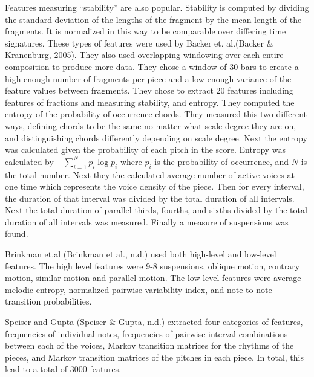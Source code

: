 \documentclass[12pt,twoside]{reedthesis}
\theoremstyle{definition}
\theoremstyle{definition}
\theoremstyle{definition}
\theoremstyle{remark}
\begin{document}
Features measuring ``stability'' are also popular. Stability is computed
by dividing the standard deviation of the lengths of the fragment by the
mean length of the fragments. It is normalized in this way to be
comparable over differing time signatures. These types of features were
used by Backer et. al.(Backer \& Kranenburg, 2005). They also used
overlapping windowing over each entire composition to produce more data.
They chose a window of 30 bars to create a high enough number of
fragments per piece and a low enough variance of the feature values
between fragments. They chose to extract 20 features including features
of fractions and measuring stability, and entropy. They computed the
entropy of the probability of occurrence chords. They measured this two
different ways, defining chords to be the same no matter what scale
degree they are on, and distinguishing chords differently depending on
scale degree. Next the entropy was calculated given the probability of
each pitch in the score. Entropy was calculated by
\(-\sum_{i = 1}^{N}p_i\log{p_i}\) where \(p_i\) is the probability of
occurrence, and \(N\) is the total number. Next they the calculated
average number of active voices at one time which represents the voice
density of the piece. Then for every interval, the duration of that
interval was divided by the total duration of all intervals. Next the
total duration of parallel thirds, fourths, and sixths divided by the
total duration of all intervals was measured. Finally a measure of
suspensions was found.

Brinkman et.al (Brinkman et al., n.d.) used both high-level and
low-level features. The high level features were 9-8 suspensions,
oblique motion, contrary motion, similar motion and parallel motion. The
low level features were average melodic entropy, normalized pairwise
variability index, and note-to-note transition probabilities.

Speiser and Gupta (Speiser \& Gupta, n.d.) extracted four categories of
features, frequencies of individual notes, frequencies of pairwise
interval combinations between each of the voices, Markov transition
matrices for the rhythms of the pieces, and Markov transition matrices
of the pitches in each piece. In total, this lead to a total of 3000
features.
\end{document}
